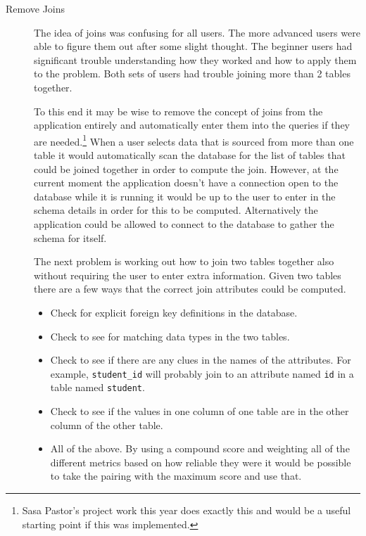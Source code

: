 \begin{description}

\item[Remove Joins] \hfill

The idea of joins was confusing for all users. The more advanced users were
able to figure them out after some slight thought. The beginner users had
significant trouble understanding how they worked and how to apply them to the
problem. Both sets of users had trouble joining more than 2 tables together.

To this end it may be wise to remove the concept of joins from the application
entirely and automatically enter them into the queries if they are
needed.\footnote{Sasa Pastor's project work this year does exactly this and
would be a useful starting point if this was implemented.} When a user selects
data that is sourced from more than one table it would automatically scan the
database for the list of tables that could be joined together in order to
compute the join. However, at the current moment the application doesn't have
a connection open to the database while it is running it would be up to the
user to enter in the schema details in order for this to be computed.
Alternatively the application could be allowed to connect to the database to
gather the schema for itself.

The next problem is working out how to join two tables together also without
requiring the user to enter extra information. Given two tables there are a few
ways that the correct join attributes could be computed.

\begin{itemize}

\item Check for explicit foreign key definitions in the database.

\item Check to see for matching data types in the two tables.

\item Check to see if there are any clues in the names of the attributes. For
	example, \texttt{student\_id} will probably join to an attribute named
	\texttt{id} in a table named \texttt{student}.

\item Check to see if the values in one column of one table are in the other
	column of the other table.

\item All of the above. By using a compound score and weighting all of the
	different metrics based on how reliable they were it would be possible to take
	the pairing with the maximum score and use that.


\end{itemize}
\end{description}
